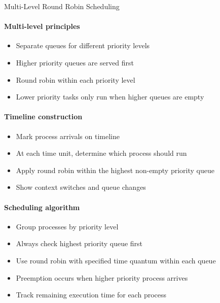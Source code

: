 \begin{KR}{Multi-Level Round Robin Scheduling}

    \begin{minipage}{0.6\linewidth}
    \paragraph{Multi-level principles}
    \begin{itemize}
        \item Separate queues for different priority levels
        \item Higher priority queues are served first
        \item Round robin within each priority level
        \item Lower priority tasks only run when higher queues are empty
    \end{itemize}
    
    \paragraph{Timeline construction}
    \begin{itemize}
        \item Mark process arrivals on timeline
        \item At each time unit, determine which process should run
        \item Apply round robin within the highest non-empty priority queue
        \item Show context switches and queue changes
    \end{itemize}
    \end{minipage}
    \hspace{2mm}
    \begin{minipage}{0.35\linewidth}
    \paragraph{Scheduling algorithm}
    \begin{itemize}
        \item Group processes by priority level
        \item Always check highest priority queue first
        \item Use round robin with specified time quantum within each queue
        \item Preemption occurs when higher priority process arrives
        \item Track remaining execution time for each process
    \end{itemize}
    \end{minipage}
\end{KR}

